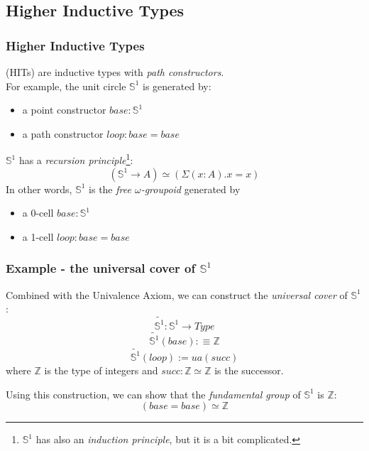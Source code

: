 \documentclass[dvipdfmx]{beamer}
\begin{document}
\subsection{Higher Inductive Types}

\begin{frame}
  \frametitle{Higher Inductive Types}
  (HITs) are inductive types with {\it path constructors}. \\
  For example, the unit circle ${\mathbb S}^1$ is generated by:
  \begin{itemize}
    \item a point constructor $base : {\mathbb S}^1$
    \item a path constructor $loop : base = base$
  \end{itemize}
  ${\mathbb S}^1$ has a {\it recursion principle}\footnote{
    ${\mathbb S}^1$ has also an {\it induction principle},
    but it is a bit complicated.}:
  $$
  \left( {\mathbb S}^1 \to A \right) \simeq
  \left( \Sigma \left( x : A \right) . x = x \right)
  $$
  In other words, ${\mathbb S}^1$ is the {\it free $\omega$-groupoid}
  generated by
  \begin{itemize}
    \item a 0-cell $base : {\mathbb S}^1$
    \item a 1-cell $loop : base = base$
  \end{itemize}
\end{frame}

\begin{frame}
  \frametitle{Example - the universal cover of ${\mathbb S}^1$}
  Combined with the Univalence Axiom,
  we can construct the {\it universal cover} of ${\mathbb S}^1$:
  $$
    \widetilde{ {\mathbb S}^1 } : {\mathbb S}^1 \to Type
  $$
  $$
    \widetilde{ {\mathbb S}^1 } \left( base \right) :\equiv {\mathbb Z}
  $$
  $$
    \widetilde{ {\mathbb S}^1 } \left( loop \right) := ua \left( succ \right)
  $$
  where ${\mathbb Z}$ is the type of integers
  and $succ : {\mathbb Z} \simeq {\mathbb Z}$ is the successor.

  Using this construction, we can show that
  the {\it fundamental group} of ${\mathbb S}^1$ is ${\mathbb Z}$:
  $$
  \left( base = base \right) \simeq {\mathbb Z}
  $$
\end{frame}
\end{document}

